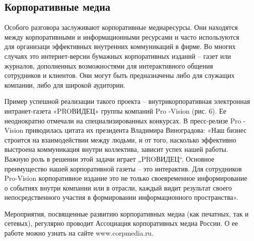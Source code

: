 \documentclass[a4paper,english,russian]{G2-105}
\begin{document}
\subsection{Корпоративные медиа}
\par Особого разговора заслуживают корпоративные медиаресурсы. Они находятся между корпоративными и информационными ресурсами и часто используются для организаци эффективных внутренних коммуникаций в фирме. Во многих случаях это интернет-версии бумажных корпоративных изданий – газет или журналов, дополненных возможностями для интерактивного общения сотрудников и клиентов. Они могут быть предназначены либо для служащих компании, либо для широкой аудитории.
\par Пример успешной реализации такого проекта – внутрикорпоративная электронная интранет-газета «PROВИДЕЦ» группы компаний Pro -Vision  (рис. 6). Ее неоднократно отмечали на специализированных конкурсах. В пресс-релизе Pro -Vision  приводилась цитата их президента Владимира Виноградова: «Наш бизнес строится на взаимодействии между людьми, и от того, насколько эффективно выстроена коммуникация внутри коллектива, зависит успех нашей работы. Важную роль в решении этой задачи играет „PROВИДЕЦ“. Основное преимущество нашей корпоративной газеты – это интерактив. Для сотрудников Pro-Vision  корпоративное издание это не только своевременное информирование о событиях внутри компании или в отрасли, каждый видит результат своего непосредственного участия в формировании информационного пространства».
\par Мероприятия, посвященные развитию корпоративных медиа (как печатных, так и сетевых), регулярно проводит Ассоциация корпоративных медиа России. О ее работе можно узнать на сайте www.corpmedia.ru.
\end{document}
